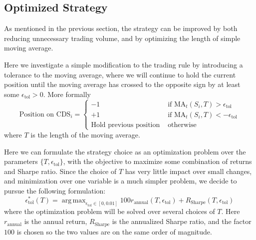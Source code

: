 \documentclass[11pt]{article}
\theoremstyle{definition}
\DeclareMathOperator*{\argmax}{arg\,max}
\begin{document}
\subsection{Optimized Strategy}

As mentioned in the previous section, 
the strategy can be improved by both reducing 
unnecessary trading volume, 
and by optimizing the length of simple moving average.

Here we investigate a simple modification to 
the trading rule by introducing a tolerance to 
the moving average,
where we will continue to hold the current position 
until the moving average has crossed to 
the opposite sign by at least some 
$\epsilon_\text{tol} > 0$.
More formally
%
\begin{equation*}
  \text{Position on CDS}_i =
  \begin{cases}
    -1 & \text{ if MA}_t(S_i,T) > \epsilon_\text{tol} \\
    +1 & \text{ if MA}_t(S_i,T) < -\epsilon_\text{tol} \\
    \text{Hold previous position} & \text{ otherwise}
  \end{cases}
\end{equation*}
%
where $T$ is the length of the moving average.

Here we can formulate the strategy choice as 
an optimization problem over 
the parameters $\{T, \epsilon_\text{tol}\}$,
with the objective to maximize some combination 
of returns and Sharpe ratio.
Since the choice of $T$ has very little impact 
over small changes, and minimization over 
one variable is a much simpler problem,
we decide to pursue the following formulation:
%
\begin{equation} \label{eq:optimization}
  \epsilon_\text{tol}^*(T) = 
  \argmax_{\epsilon_\text{tol} \in [0, 0.01]}
    100 r_\text{annual}(T,\epsilon_\text{tol}) + 
    R_\text{Sharpe}(T,\epsilon_\text{tol})
\end{equation}
%
where the optimization problem will be solved 
over several choices of $T$.
Here $r_\text{annual}$ is the annual return,
$R_\text{Sharpe}$ is the annualized Sharpe ratio,
and the factor $100$ is chosen so the two values 
are on the same order of magnitude.
\end{document}
